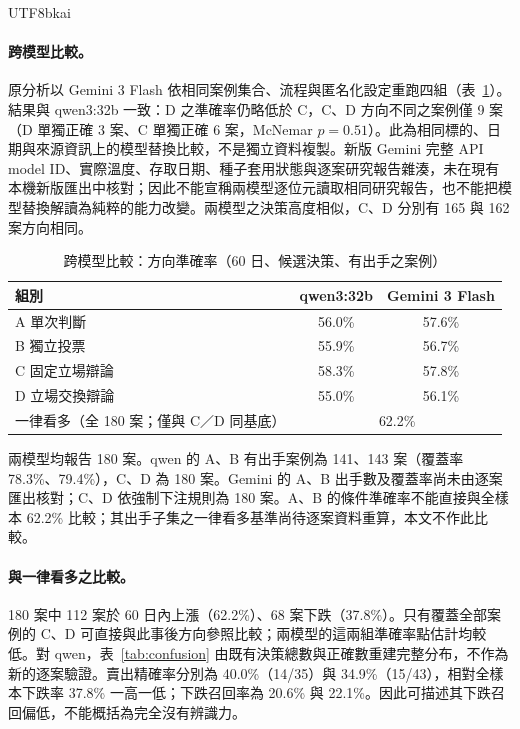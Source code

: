 \documentclass[12pt,a4paper]{article}
\newcommand{\grp}[1]{\textsf{#1}}
\begin{document}
\begin{CJK}{UTF8}{bkai}
\paragraph{跨模型比較。} 原分析以 Gemini 3 Flash 依相同案例集合、流程與匿名化設定重跑四組（表~\ref{tab:flash}）。結果與 qwen3:32b 一致：\grp{D} 之準確率仍略低於 \grp{C}，\grp{C}、\grp{D} 方向不同之案例僅 9 案（\grp{D} 單獨正確 3 案、\grp{C} 單獨正確 6 案，McNemar $p=0.51$）。此為相同標的、日期與來源資訊上的模型替換比較，不是獨立資料複製。新版 Gemini 完整 API model ID、實際溫度、存取日期、種子套用狀態與逐案研究報告雜湊，未在現有本機新版匯出中核對；因此不能宣稱兩模型逐位元讀取相同研究報告，也不能把模型替換解讀為純粹的能力改變。兩模型之決策高度相似，\grp{C}、\grp{D} 分別有 165 與 162 案方向相同。

\begin{table}[H]
\centering\small
\caption{跨模型比較：方向準確率（60 日、候選決策、有出手之案例）}
\label{tab:flash}
\begin{tabular}{@{}lcc@{}}
\toprule
組別 & qwen3:32b & Gemini 3 Flash \\
\midrule
\grp{A} 單次判斷 & 56.0\% & 57.6\% \\
\grp{B} 獨立投票 & 55.9\% & 56.7\% \\
\grp{C} 固定立場辯論 & 58.3\% & 57.8\% \\
\grp{D} 立場交換辯論 & 55.0\% & 56.1\% \\
\midrule
一律看多（全 180 案；僅與 C／D 同基底） & \multicolumn{2}{c}{62.2\%} \\
\bottomrule
\end{tabular}
\par\smallskip
\raggedright\footnotesize 兩模型均報告 180 案。qwen 的 A、B 有出手案例為 141、143 案（覆蓋率 78.3\%、79.4\%），C、D 為 180 案。Gemini 的 A、B 出手數及覆蓋率尚未由逐案匯出核對；C、D 依強制下注規則為 180 案。A、B 的條件準確率不能直接與全樣本 62.2\% 比較；其出手子集之一律看多基準尚待逐案資料重算，本文不作此比較。
\end{table}

\paragraph{與一律看多之比較。} 180 案中 112 案於 60 日內上漲（62.2\%）、68 案下跌（37.8\%）。只有覆蓋全部案例的 \grp{C}、\grp{D} 可直接與此事後方向參照比較；兩模型的這兩組準確率點估計均較低。對 qwen，表~\ref{tab:confusion} 由既有決策總數與正確數重建完整分布，不作為新的逐案驗證。賣出精確率分別為 40.0\%（14/35）與 34.9\%（15/43），相對全樣本下跌率 37.8\% 一高一低；下跌召回率為 20.6\% 與 22.1\%。因此可描述其下跌召回偏低，不能概括為完全沒有辨識力。


\end{CJK}
\end{document}
